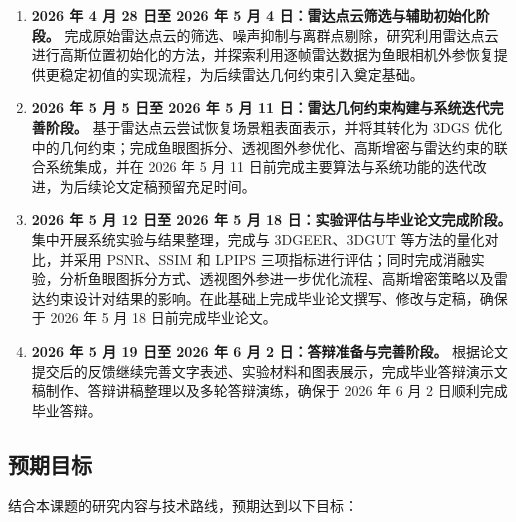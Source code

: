 \begin{enumerate}
    \item \textbf{2026 年 4 月 28 日至 2026 年 5 月 4 日：雷达点云筛选与辅助初始化阶段。} 完成原始雷达点云的筛选、噪声抑制与离群点剔除，研究利用雷达点云进行高斯位置初始化的方法，并探索利用逐帧雷达数据为鱼眼相机外参恢复提供更稳定初值的实现流程，为后续雷达几何约束引入奠定基础。

    \item \textbf{2026 年 5 月 5 日至 2026 年 5 月 11 日：雷达几何约束构建与系统迭代完善阶段。} 基于雷达点云尝试恢复场景粗表面表示，并将其转化为 3DGS 优化中的几何约束；完成鱼眼图拆分、透视图外参优化、高斯增密与雷达约束的联合系统集成，并在 2026 年 5 月 11 日前完成主要算法与系统功能的迭代改进，为后续论文定稿预留充足时间。

    \item \textbf{2026 年 5 月 12 日至 2026 年 5 月 18 日：实验评估与毕业论文完成阶段。} 集中开展系统实验与结果整理，完成与 3DGEER、3DGUT 等方法的量化对比，并采用 PSNR、SSIM 和 LPIPS 三项指标进行评估；同时完成消融实验，分析鱼眼图拆分方式、透视图外参进一步优化流程、高斯增密策略以及雷达约束设计对结果的影响。在此基础上完成毕业论文撰写、修改与定稿，确保于 2026 年 5 月 18 日前完成毕业论文。

    \item \textbf{2026 年 5 月 19 日至 2026 年 6 月 2 日：答辩准备与完善阶段。} 根据论文提交后的反馈继续完善文字表述、实验材料和图表展示，完成毕业答辩演示文稿制作、答辩讲稿整理以及多轮答辩演练，确保于 2026 年 6 月 2 日顺利完成毕业答辩。
\end{enumerate}

\subsection{预期目标}

结合本课题的研究内容与技术路线，预期达到以下目标：

